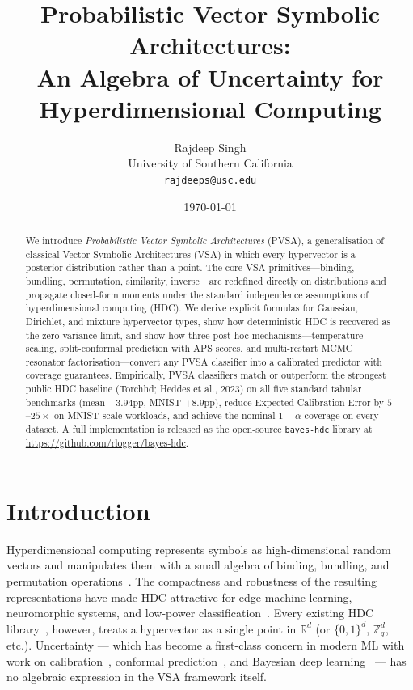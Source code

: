\documentclass[11pt]{article}
\title{Probabilistic Vector Symbolic Architectures:\\
An Algebra of Uncertainty for Hyperdimensional Computing}
\author{Rajdeep Singh\\
University of Southern California\\
\texttt{rajdeeps@usc.edu}}
\date{\today}
\begin{document}
\maketitle

\begin{abstract}
We introduce \emph{Probabilistic Vector Symbolic Architectures} (PVSA), a
generalisation of classical Vector Symbolic Architectures (VSA) in which
every hypervector is a posterior distribution rather than a point. The
core VSA primitives---binding, bundling, permutation, similarity,
inverse---are redefined directly on distributions and propagate
closed-form moments under the standard independence assumptions of
hyperdimensional computing (HDC). We derive explicit formulas for
Gaussian, Dirichlet, and mixture hypervector types, show how
deterministic HDC is recovered as the zero-variance limit, and show how
three post-hoc mechanisms---temperature scaling, split-conformal
prediction with APS scores, and multi-restart MCMC resonator
factorisation---convert any PVSA classifier into a calibrated predictor
with coverage guarantees. Empirically, PVSA classifiers match or
outperform the strongest public HDC baseline (Torchhd; Heddes et al.,
2023) on all five standard tabular benchmarks (mean $+3.94$pp,
MNIST $+8.9$pp), reduce Expected Calibration Error by $5$--$25\times$
on MNIST-scale workloads, and achieve the nominal $1 - \alpha$ coverage
on every dataset. A full implementation is released as the open-source
\texttt{bayes-hdc} library at \url{https://github.com/rlogger/bayes-hdc}.
\end{abstract}

\section{Introduction}
\label{sec:intro}

Hyperdimensional computing represents symbols as high-dimensional random
vectors and manipulates them with a small algebra of binding, bundling,
and permutation operations~\citep{kanerva2009hyperdimensional}. The
compactness and robustness of the resulting representations have made
HDC attractive for edge machine learning, neuromorphic systems, and
low-power classification~\citep{kleyko2022survey1,kleyko2022survey2}.
Every existing HDC library~\citep{heddes2023torchhd,cumbo2023hdlib,
vandervorst2023pybhv}, however, treats a hypervector as a single point
in $\mathbb{R}^d$ (or $\{0, 1\}^d$, $\mathbb{Z}_q^d$, etc.). Uncertainty
--- which has become a first-class concern in modern ML with work on
calibration~\citep{guo2017calibration}, conformal
prediction~\citep{romano2020classification}, and Bayesian deep
learning~\citep{lakshminarayanan2017simple} --- has no algebraic
expression in the VSA framework itself.
\end{document}
